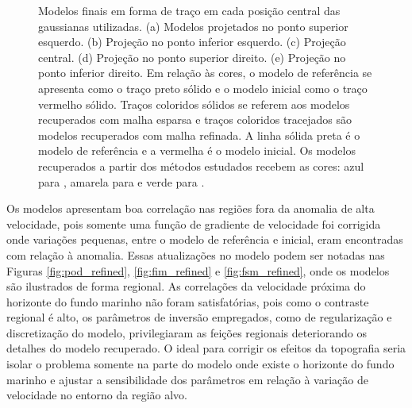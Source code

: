 \begin{figure}[H]
	
	\caption{Modelos finais em forma de traço em cada posição central das gaussianas utilizadas. (a) Modelos projetados no ponto superior esquerdo. (b) Projeção no ponto inferior esquerdo. (c) Projeção central. (d) Projeção no ponto superior direito. (e) Projeção no ponto inferior direito. Em relação às cores, o modelo de referência se apresenta como o traço preto sólido e o modelo inicial como o traço vermelho sólido. Traços coloridos sólidos se referem aos modelos recuperados com malha esparsa e traços coloridos tracejados são modelos recuperados com malha refinada. A linha sólida preta é o modelo de referência e a vermelha é o modelo inicial. Os modelos recuperados a partir dos métodos estudados recebem as cores: azul para , amarela para  e verde para . }
	\label{fig:model_profile}
\end{figure}

Os modelos apresentam boa correlação nas regiões fora da anomalia de alta velocidade, pois somente uma função de gradiente de velocidade foi corrigida onde variações pequenas, entre o modelo de referência e inicial, eram encontradas com relação à anomalia. Essas atualizações no modelo podem ser notadas nas Figuras \ref{fig:pod_refined}, \ref{fig:fim_refined} e \ref{fig:fsm_refined}, onde os modelos são ilustrados de forma regional. As correlações da velocidade próxima do horizonte do fundo marinho não foram satisfatórias, pois como o contraste regional é alto, os parâmetros de inversão empregados, como de regularização e discretização do modelo, privilegiaram as feições regionais deteriorando os detalhes do modelo recuperado. O ideal para corrigir os efeitos da topografia seria isolar o problema somente na parte do modelo onde existe o horizonte do fundo marinho e ajustar a sensibilidade dos parâmetros em relação à variação de velocidade no entorno da região alvo.  

